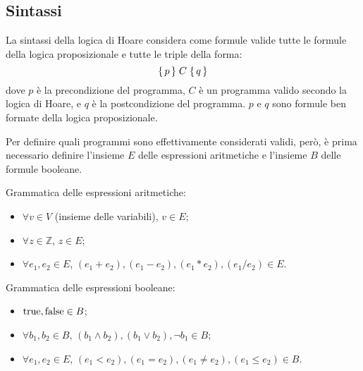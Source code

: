 \subsection*{Sintassi}
La sintassi della logica di Hoare considera come formule valide tutte
le formule della logica proposizionale e tutte le triple della forma:
\[
    \Hoaretriple{p}{C}{q}
\]
dove $p$ è la precondizione del programma,
$C$ è un programma valido secondo la logica di Hoare, e $q$ è la postcondizione
del programma. $p$ e $q$ sono formule ben formate della logica proposizionale.

Per definire quali programmi sono effettivamente considerati validi, però,
è prima necessario definire l'insieme $E$ delle espressioni aritmetiche
e l'insieme $B$ delle formule booleane.

Grammatica delle espressioni aritmetiche:
\begin{itemize}
    \item $\forall v \in V$ (insieme delle variabili), $v \in E$;
    \item $\forall z \in \mathbb{Z}$, $z \in E$;
    \item $\forall e_1, e_2 \in E$, $(e_1+e_2), (e_1-e_2), (e_1*e_2), (e_1/e_2) \in E$.
\end{itemize}
Grammatica delle espressioni booleane:
\begin{itemize}
    \item $\textnormal{true}, \textnormal{false} \in B$;
    \item $\forall b_1, b_2 \in B$, $(b_1 \land b_2), (b_1 \lor b_2), \lnot b_1 \in B$;
    \item $\forall e_1, e_2 \in E$, $(e_1 < e_2), (e_1 = e_2), (e_1 \neq e_2), (e_1 \le e_2) \in B$.
\end{itemize}

